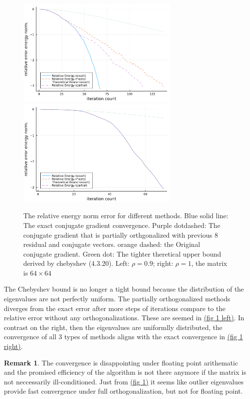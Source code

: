 \documentclass[]{article}
\theoremstyle{definition}
\newtheorem{remark}{Remark}[subsection]
\begin{document}
        \begin{figure}[h]\label{fig:1}
            \centering
            \includegraphics[width=8cm]{cg_convergence_0.9.png}
            \includegraphics[width=8cm]{cg_convergence_1.png}
            \caption{
                The relative energy norm error for different methods. Blue solid line: The exact conjugate gradient convergence. Purple dotdashed: The conjugate gradient that is partially orthgonalized with previous 8 residual and conjugate vectors. orange dashed: the Original conjugate gradient. Green dot: The tighter theretical upper bound derived by chebyshev (4.3.20). Left: $\rho = 0.9$; right: $\rho = 1$, the matrix is $64\times 64$
            }
        \end{figure}
        The Chebyshev bound is no longer a tight bound because the distribution of the eigenvalues are not perfectly uniform. The partially orthogonalized methods diverges from the exact error after more steps of iterations compare to the relative error without any orthogonalizations. These are seemed in \hyperref[fig:1]{(fig 1 left)}. In contrast on the right, then the eigenvalues are uniformlly distributed, the convergence of all 3 types of methods aligns with the exact convergence in \hyperref[fig:1]{(fig 1 right)}. 
        \begin{remark}
            The convergence is disappointing under floating point arithematic and the promised efficiency of the algorithm is not there anymore if the matrix is not neccessarily ill-conditioned. Just from \hyperref[fig:1]{(fig 1)} it seems like outlier eigenvalues provide fast convergence under full orthogonalization, but not for floating point. 
        \end{remark}
\end{document}
